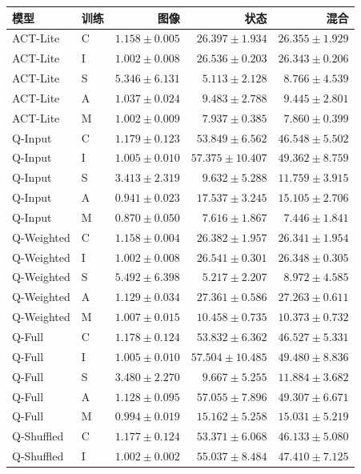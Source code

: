 \documentclass[11pt,a4paper,fontset=fandol]{ctexart}
\begin{document}
\begin{center}
\footnotesize
\begin{tabular}{llrrr}
\toprule
模型 & 训练 & 图像 & 状态 & 混合 \\
\midrule
ACT-Lite & C & $1.158\pm0.005$ & $26.397\pm1.934$ & $26.355\pm1.929$ \\
ACT-Lite & I & $1.002\pm0.008$ & $26.536\pm0.203$ & $26.343\pm0.206$ \\
ACT-Lite & S & $5.346\pm6.131$ & $5.113\pm2.128$ & $8.766\pm4.539$ \\
ACT-Lite & A & $1.037\pm0.024$ & $9.483\pm2.788$ & $9.445\pm2.801$ \\
ACT-Lite & M & $1.002\pm0.009$ & $7.937\pm0.385$ & $7.860\pm0.399$ \\
Q-Input & C & $1.179\pm0.123$ & $53.849\pm6.562$ & $46.548\pm5.502$ \\
Q-Input & I & $1.005\pm0.010$ & $57.375\pm10.407$ & $49.362\pm8.759$ \\
Q-Input & S & $3.413\pm2.319$ & $9.632\pm5.288$ & $11.759\pm3.915$ \\
Q-Input & A & $0.941\pm0.023$ & $17.537\pm3.245$ & $15.105\pm2.706$ \\
Q-Input & M & $0.870\pm0.050$ & $7.616\pm1.867$ & $7.446\pm1.841$ \\
Q-Weighted & C & $1.158\pm0.004$ & $26.382\pm1.957$ & $26.341\pm1.954$ \\
Q-Weighted & I & $1.002\pm0.008$ & $26.541\pm0.301$ & $26.348\pm0.305$ \\
Q-Weighted & S & $5.492\pm6.398$ & $5.217\pm2.207$ & $8.972\pm4.585$ \\
Q-Weighted & A & $1.129\pm0.034$ & $27.361\pm0.586$ & $27.263\pm0.611$ \\
Q-Weighted & M & $1.007\pm0.015$ & $10.458\pm0.735$ & $10.373\pm0.732$ \\
Q-Full & C & $1.178\pm0.124$ & $53.832\pm6.362$ & $46.527\pm5.331$ \\
Q-Full & I & $1.005\pm0.010$ & $57.504\pm10.485$ & $49.480\pm8.836$ \\
Q-Full & S & $3.480\pm2.270$ & $9.667\pm5.255$ & $11.884\pm3.682$ \\
Q-Full & A & $1.128\pm0.095$ & $57.055\pm7.896$ & $49.307\pm6.671$ \\
Q-Full & M & $0.994\pm0.019$ & $15.162\pm5.258$ & $15.031\pm5.219$ \\
Q-Shuffled & C & $1.177\pm0.124$ & $53.371\pm6.068$ & $46.133\pm5.080$ \\
Q-Shuffled & I & $1.002\pm0.002$ & $55.037\pm8.484$ & $47.410\pm7.125$ \\

\end{tabular}
\end{center}
\end{document}
